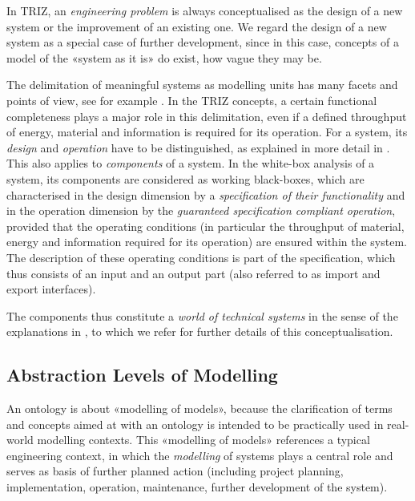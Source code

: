 \documentclass[11pt,a4paper]{article}
\begin{document}
In TRIZ, an \emph{engineering problem} is always conceptualised as the design
of a new system or the improvement of an existing one. We regard the design of
a new system as a special case of further development, since in this case,
concepts of a model of the «system as it is» do exist, how vague they may be.

The delimitation of meaningful systems as modelling units has many facets and
points of view, see for example \cite[section 8]{Szyperski2002}. In the TRIZ
concepts, a certain functional completeness plays a major role in this
delimitation, even if a defined throughput of energy, material and information
is required for its operation.  For a system, its \emph{design} and
\emph{operation} have to be distinguished, as explained in more detail in
\cite{Graebe2020}. This also applies to \emph{components} of a system.  In the
white-box analysis of a system, its components are considered as working
black-boxes, which are characterised in the design dimension by a
\emph{specification of their functionality} and in the operation dimension by
the \emph{guaranteed specification compliant operation}, provided that the
operating conditions (in particular the throughput of material, energy and
information required for its operation) are ensured within the system. The
description of these operating conditions is part of the specification, which
thus consists of an input and an output part (also referred to as import and
export interfaces).

The components thus constitute a \emph{world of technical systems} in the
sense of the explanations in \cite{Graebe2020}, to which we refer for further
details of this conceptualisation.

\subsection{Abstraction Levels of Modelling}

An ontology is about «modelling of models», because the clarification of terms
and concepts aimed at with an ontology is intended to be practically used in
real-world modelling contexts.  This «modelling of models» references a
typical engineering context, in which the \emph{modelling} of systems plays a
central role and serves as basis of further planned action (including project
planning, implementation, operation, maintenance, further development of the
system).
\end{document}
